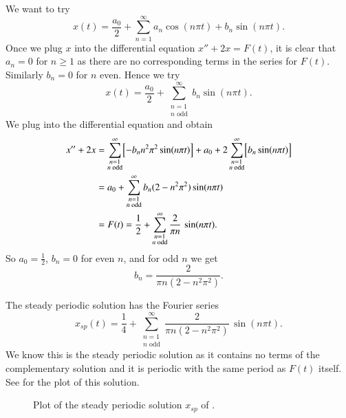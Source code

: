 \begin{example}
We want to try
\begin{equation*}
x(t) = \frac{a_0}{2} + \sum_{n=1}^\infty
a_n \cos (n \pi t) +
b_n \sin (n \pi t) .
\end{equation*}
Once we plug $x$ into the differential equation $x''+2x = F(t)$,
it is clear that $a_n = 0$ for $n \geq 1$ as there are no corresponding terms
in the series for
$F(t)$.  Similarly $b_n = 0$ for $n$ even.  Hence we try
\begin{equation*}
x(t) = \frac{a_0}{2} +
\sum_{\substack{n=1 \\ n \text{ odd}}}^\infty
b_n \sin (n \pi t) .
\end{equation*}
We plug into the differential equation and obtain
\begin{equation*}
\begin{split}
x'' + 2 x & =
\sum_{\substack{n=1 \\ n \text{ odd}}}^\infty
\Bigl[ - b_n n^2 \pi^2 \sin (n \pi t) \Bigr] + 
a_0 +
2
\sum_{\substack{n=1 \\ n \text{ odd}}}^\infty
\Bigl[ b_n \sin (n \pi t) \Bigr]
\\
& =
a_0 +
\sum_{\substack{n=1 \\ n \text{ odd}}}^\infty
b_n (2 - n^2 \pi^2 ) \sin (n \pi t)
\\
& =
F(t) = \frac{1}{2} + \sum_{\substack{n=1 \\ n \text{ odd}}}^\infty
\frac{2}{\pi n} \, \sin (n \pi t) .
\end{split}
\end{equation*}
So $a_0 = \frac{1}{2}$, $b_n = 0$ for even $n$, and for odd $n$ we
get
\begin{equation*}
b_n = 
\frac{2}{\pi n (2 - n^2 \pi^2 )} .
\end{equation*}

The steady periodic solution has the Fourier series
\begin{equation*}
x_{sp}(t) = \frac{1}{4} + \sum_{\substack{n=1 \\ n \text{ odd}}}^\infty
\frac{2}{\pi n (2 - n^2 \pi^2 )} \,
\sin (n \pi t) .
\end{equation*}
We know this is the steady periodic solution as it contains no terms 
of the complementary solution and it is periodic with the same period as
$F(t)$ itself.  See  for the plot of this solution.
\begin{figure}[h!t]
\capstart
\begin{center}
\caption{Plot of the steady periodic solution $x_{sp}$ of
.%
\label{afs:steadyexfig}}
\end{center}
\end{figure}
\end{example}

